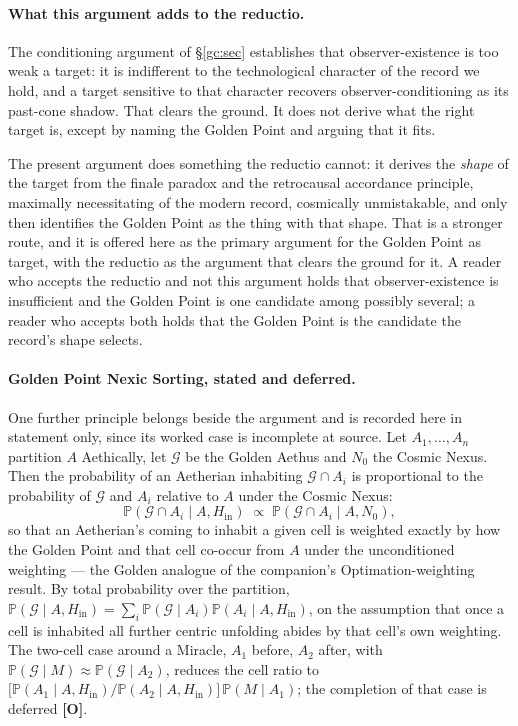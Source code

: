 \documentclass[11pt]{article}
\numberwithin{equation}{section}
\theoremstyle{plain}
\theoremstyle{definition}
\theoremstyle{remark}
\newcommand{\PP}{\mathbb{P}}
\begin{document}
\paragraph{What this argument adds to the reductio.}\label{ra:rem:spine}
The conditioning argument of \S\ref{gc:sec} establishes that
observer-existence is too weak a target: it is indifferent to the
technological character of the record we hold, and a target sensitive to
that character recovers observer-conditioning as its past-cone shadow.
That clears the ground. It does not derive what the right target is,
except by naming the Golden Point and arguing that it fits.

The present argument does something the reductio cannot: it derives the
\emph{shape} of the target from the finale paradox and the retrocausal
accordance principle, maximally necessitating of the modern record,
cosmically unmistakable, and only then identifies the Golden Point as
the thing with that shape. That is a stronger route, and it is offered
here as the primary argument for the Golden Point as target, with the
reductio as the argument that clears the ground for it. A reader who
accepts the reductio and not this argument holds that observer-existence
is insufficient and the Golden Point is one candidate among possibly
several; a reader who accepts both holds that the Golden Point is the
candidate the record's shape selects.

\paragraph{Golden Point Nexic Sorting, stated and deferred.}\label{ra:rem:sorting}
One further principle belongs beside the argument and is recorded here in
statement only, since its worked case is incomplete at source. Let
$A_1,\dots,A_n$ partition $A$ Aethically, let $\mathcal G$ be the Golden
Aethus and $N_0$ the Cosmic Nexus. Then the probability of an Aetherian
inhabiting $\mathcal G\cap A_i$ is proportional to the probability of
$\mathcal G$ and $A_i$ relative to $A$ under the Cosmic Nexus:
\begin{equation}\label{ra:eq:sorting}
\PP(\mathcal G\cap A_i\mid A,H_{\mathrm{in}})\;\propto\;
\PP(\mathcal G\cap A_i\mid A,N_0),
\end{equation}
so that an Aetherian's coming to inhabit a given cell is weighted
exactly by how the Golden Point and that cell co-occur from $A$ under
the unconditioned weighting --- the Golden analogue of the companion's
Optimation-weighting result. By total probability over the partition,
$\PP(\mathcal G\mid A,H_{\mathrm{in}})=\sum_i\PP(\mathcal G\mid A_i)
\PP(A_i\mid A,H_{\mathrm{in}})$, on the assumption that once a cell is
inhabited all further centric unfolding abides by that cell's own
weighting. The two-cell case around a Miracle, $A_1$ before, $A_2$
after, with $\PP(\mathcal G\mid M)\approx\PP(\mathcal G\mid A_2)$, reduces the cell ratio to
$\bigl[\PP(A_1\mid A,H_{\mathrm{in}})/\PP(A_2\mid A,H_{\mathrm{in}})\bigr]
\,\PP(M\mid A_1)$; the completion of that case is deferred
\textbf{[O]}.
\end{document}
